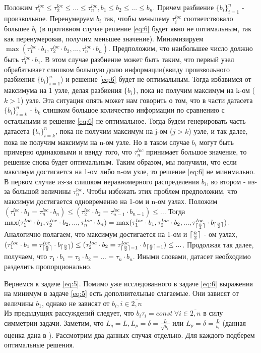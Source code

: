 \documentclass{article}
\DeclarePairedDelimiter\ceil{\lceil}{\rceil}
\begin{document}
Положим $\tau_1^{loc}\leq \tau_2^{loc}\leq ... \leq \tau_n^{loc}, b_1\leq b_2\leq ... \leq b_n$. Причем разбиение $\{b_i\}_{i = 1}^n$ - произвольное. Перенумеруем $b_i$ так, чтобы меньшему $\tau_i^{loc}$ соответствовало большее $b_i$ (в противном случае решение \ref{eq:6} будет явно не оптимальным, так как перенумеровав, получим меньшее значение). Минимизируем $\max(\tau_1^{loc}\cdot b_1, \tau_2^{loc}\cdot b_2, ..., \tau_n^{loc}\cdot b_n)$. Предположим, что наибольшее число должно быть $\tau_1^{loc}\cdot b_1$. В этом случае разбиение может быть таким, что первый узел обрабатывает слишком большую долю информации(ввиду произвольного разбиения $\{b_i\}_{i = 1}^n$) и решение \ref{eq:6} будет не оптимальным. Тогда избавимся от максимума на 1 узле, делая разбиения $\{b_i\}$, пока не получим максимум на k-ом ($k > 1$) узле. Эта ситуация опять может нам говорить о том, что в части датасета $\{b_i\}_{i = k}^n$ - $b_k$ слишком большое количество информации по сравнению с остальными и решение \ref{eq:6} не оптимальное. Тогда будем генерировать часть датасета $\{b_i\}_{i = k}^n$, пока не получим максимум на j-ом ($j > k$) узле, и так далее, пока не получим максимум на n-ом узле. Но в таком случае $b_i$ могут быть примерно одинаковыми и ввиду того, что $\tau_n^{loc}$ принимает большое значение, то решение снова будет оптимальным. Таким образом, мы получили, что если максимум достигается на 1-ом либо n-ом узле, то решение \ref{eq:6} не минимально. В первом случае из-за слишком неравномерного распределения $b_i$, во втором - из-за большой величины $\tau_n^{loc}$. Чтобы избежать этих проблем предположим, что максимум достигается одновременно на 1-ом и n-ом узлах. Положим $(\tau_1^{loc}\cdot b_1 = \tau_n^{loc}\cdot b_n)\leq (\tau_2^{loc}\cdot b_2 = \tau_{n-1}^{loc}\cdot b_{n-1})\leq ...$ Тогда $\max(\tau_1^{loc}\cdot b_1, \tau_2^{loc}\cdot b_2, ..., \tau_n^{loc}\cdot b_n) = \max(\tau_1^{loc}\cdot b_1, \tau_2^{loc}\cdot b_2, ..., \tau_{\ceil{\frac{n}{2}}}^{loc}\cdot b_{\ceil{\frac{n}{2}}})$. Аналогично полагаем, что максимум достигается на 1-ом и $\ceil{\frac{n}{2}}$ - ом узлах, $(\tau_1^{loc}\cdot b_1 = \tau_{\ceil{\frac{n}{2}}}^{loc}\cdot b_{\ceil{\frac{n}{2}}})\leq (\tau_2^{loc}\cdot b_2 = \tau_{\ceil{\frac{n}{2}}-1}^{loc}\cdot b_{\ceil{\frac{n}{2}}-1})\leq ...$. Продолжая так далее, получаем, что $\tau_1\cdot b_1 = \tau_2\cdot b_2 = ... = \tau_n\cdot b_n$. Иными словами, датасет необходимо разделить пропорционально.

Вернемся к задаче \ref{eq:5}. Помимо уже исследованного в задаче \ref{eq:6} выражения на минимум в задаче \ref{eq:5} есть дополнительные слагаемые. Они зависят от величины $b_1$, однако не зависят от $b_i, i \in \overline{2, n}$
\\
Из предыдущих рассуждений следует, что $b_i \tau _i = const ~ \forall i \in \overline{2, n}$  в силу симметрии задачи. Заметим, что $L_q = L, L_p = \delta = \frac{L}{\sqrt{b_i}}$ или $L_p = \delta = \frac{L}{b_i}$ (данная оценка дана в \cite{kovalev2022optimal}). Рассмотрим два данных случая отдельно. Для каждого подберем оптимальные решения.
\\
\end{document}

